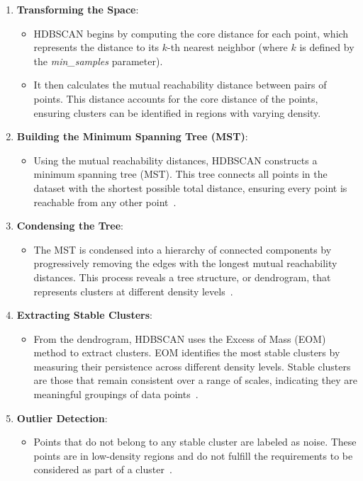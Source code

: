 \begin{enumerate}
    \item \textbf{Transforming the Space}:
    \begin{itemize}
        \item HDBSCAN begins by computing the core distance for each point, which represents the distance to its $k$-th nearest neighbor (where $k$ is defined by the \textit{min\_samples} parameter).
        \item It then calculates the mutual reachability distance between pairs of points. This distance accounts for the core distance of the points, ensuring clusters can be identified in regions with varying density.
    \end{itemize}
    
    \item \textbf{Building the Minimum Spanning Tree (MST)}:
    \begin{itemize}
        \item Using the mutual reachability distances, HDBSCAN constructs a minimum spanning tree (MST). This tree connects all points in the dataset with the shortest possible total distance, ensuring every point is reachable from any other point~\citep{hdbscanComparingPython}.
    \end{itemize}
    
    \item \textbf{Condensing the Tree}:
    \begin{itemize}
        \item The MST is condensed into a hierarchy of connected components by progressively removing the edges with the longest mutual reachability distances. This process reveals a tree structure, or dendrogram, that represents clusters at different density levels~\citep{hdbscanComparingPython}.
    \end{itemize}
    
    \item \textbf{Extracting Stable Clusters}:
    \begin{itemize}
        \item From the dendrogram, HDBSCAN uses the Excess of Mass (EOM) method to extract clusters. EOM identifies the most stable clusters by measuring their persistence across different density levels. Stable clusters are those that remain consistent over a range of scales, indicating they are meaningful groupings of data points~\citep{hdbscanComparingPython}.
    \end{itemize}
    
    \item \textbf{Outlier Detection}:
    \begin{itemize}
        \item Points that do not belong to any stable cluster are labeled as noise. These points are in low-density regions and do not fulfill the requirements to be considered as part of a cluster~\citep{HDBSCAN_algo_campello2013density, HDBSCAN_2015_campello2015hierarchical}.
    \end{itemize}
\end{enumerate}


